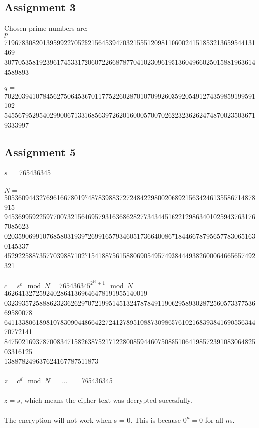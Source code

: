 \documentclass[11pt,a4paper]{article}
\begin{document}
\subsection{Assignment 3}
Chosen prime numbers are: \\
$p = $ 719678308201395992270525215645394703215551209811060024151853213659544131469\\3077053581923961745331720607226687877041023096195136049660250158819636144589893\\\\
$q = $ 702203941078456275064536701177522602870107099260359205491274359859199591102\\5455679529540299006713316856397262016000570070262232362624748700235036719333997
\subsection{Assignment 5}
$s = $ 765436345
\\\\$N =$ 505360944327696166780197487839883727248422980020689215634246135586714878915\\9453699592259770073215646957931636862827734344516221298634010259437631767085623\\0203590699107685803193972699165793460517366400867184466787956577830651630145337\\452922588735770398871027154188756158806905495749384449382600064665657492321 
\\\\$c = s^e\mod N = 765436345^{2^{16}+1} \mod N = $ 46264132725924028641369646478191955140019\\03239357258886232362629707219951451324787849119062958930287256057337753669580078\\64113380618981078309044866422724127895108873098657610216839384169055634470772141\\84750216937870083471582638752171228008594460750885106419857239108306482503316125\\138878249637624167787511873
\\\\$z = c^d\mod N = $ ... $ = $ 765436345
\\\\$z = s$, which means the cipher text was decrypted succesfully.
\\\\ 
The encryption will not work when s = 0. This is because $0^n = 0$ for all $n$s.
\end{document}
